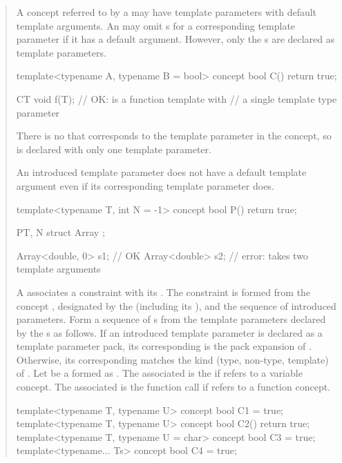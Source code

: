 \begin{quote}
\pnum
\enternote
A concept referred to by a  may have template 
parameters with default template arguments. An  
may omit s for a corresponding template
parameter if it has a default argument. 
% 
However, only the s are declared
as template parameters. 
% 
\enterexample
\begin{codeblock}
template<typename A, typename B = bool> concept bool C() { return true; }

C{T} void f(T); // OK:  is a function template with
                // a single template type parameter 
\end{codeblock}
There is no  that corresponds to the 
template parameter  in the  concept, so  is 
declared with only one template parameter.
\exitexample
\exitnote


\pnum
An introduced template parameter does not have a default template argument 
even if its corresponding template parameter does.
% 
\enterexample
\begin{codeblock}
template<typename T, int N = -1> concept bool P() { return true; }

P{T, N} struct Array { };

Array<double, 0> s1; // OK
Array<double> s2;    // error:  takes two template arguments
\end{codeblock}
\exitexample


\pnum
A  associates a constraint with its
.
% 
The constraint is formed from the concept , designated by the
 (including its
), 
and the sequence of introduced parameters.
% 
Form a sequence of s
 from the template parameters declared by the
s as follows. 
% 
If an introduced template parameter  is declared as a template 
parameter pack, its corresponding  is the pack
expansion of . 
% 
% 
Otherwise, its corresponding  matches the 
kind (type, non-type, template) of .
% 
Let  be a 
formed as .
% 
The associated  is
the  
if  refers to a variable concept. 
% 
The associated  is
the function call  if  refers to a function 
concept.
% 
\enterexample
\begin{codeblock}
template<typename T, typename U> concept bool C1 = true;
template<typename T, typename U> concept bool C2() { return true; }
template<typename T, typename U = char> concept bool C3 = true;
template<typename... Ts> concept bool C4 = true;


\end{codeblock}
\end{quote}
